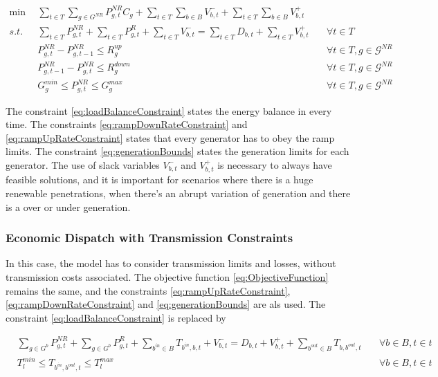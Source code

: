 \documentclass[12pt,LUDisStyle,twosided]{book}
\newcommand{\mc}{\mathcal}
\begin{document}
\begin{subequations}\label{model:simple_ED}
\begin{alignat}{4}
\min ~~& \sum_{t \in T}\sum_{g \in G^{NR}} P^{NR}_{g,t} C_{g} + \sum_{t \in T}\sum_{b \in B} V^{-}_{b,t} + \sum_{t \in T}\sum_{b \in B} V^{+}_{b,t} \label{eq:ObjectiveFunction} \\
s.t. ~~~& \sum_{t \in T} P^{NR}_{g,t} + \sum_{t \in T} P^{R}_{g,t} + \sum_{t \in T}V^{-}_{b,t} = \sum_{t \in T} D_{b,t}  + \sum_{t \in T}V^{+}_{b,t}  &~& \forall t \in T  \label{eq:loadBalanceConstraint} \\
& P^{NR}_{g,t} - P^{NR}_{g,t - 1} \leq R^{up}_{g} &~& \forall t \in T, g \in \mc{G}^{NR}\label{eq:rampUpRateConstraint} \\
& P^{NR}_{g,t -1 } - P^{NR}_{g,t} \leq R^{down}_{g} &~& \forall t \in T, g \in \mc{G}^{NR}\label{eq:rampDownRateConstraint} \\
& G^{min}_{g}\leq P^{NR}_{g,t} \leq G^{max}_{g} &~& \forall t \in T, g \in \mc{G}^{NR}\label{eq:generationBounds}
\end{alignat} 
\end{subequations}

The constraint \ref{eq:loadBalanceConstraint} states the energy balance in every time. The constraints \ref{eq:rampDownRateConstraint} and \ref{eq:rampUpRateConstraint} states that every generator has to obey the ramp limits. The constraint \ref{eq:generationBounds} states the generation limits for each generator. The use of slack variables $V^{-}_{b,t}$ and $V^{+}_{b,t}$ is necessary to always have feasible solutions, and it is important for scenarios where there is a huge renewable penetrations, when there's an abrupt variation of generation and there is a over or under generation.   

\subsubsection{Economic Dispatch with Transmission Constraints}

In this case, the model has to consider transmission limits and losses, without transmission costs associated. The objective function \ref{eq:ObjectiveFunction} remains the same, and the constraints \ref{eq:rampUpRateConstraint}, \ref{eq:rampDownRateConstraint} and \ref{eq:generationBounds} are als used. The constraint \ref{eq:loadBalanceConstraint} is replaced by  

\begin{subequations}\label{model:edTransmissionConstraints}
\begin{alignat}{4}
&\sum_{g \in G^{b}} P^{NR}_{g,t} + \sum_{g \in G^{b}} P^{R}_{g,t} + \sum_{b^{in} \in B} T_{b^{in},b,t} + V^{-}_{b,t} = D_{b,t}  + V^{+}_{b,t} + \sum_{b^{out} \in B} T_{b,b^{out},t}  &~& \forall b \in B, t \in t \label{eq:transmissionBalanceConstraint} \\
& T^{min}_{l} \leq T_{b^{in},b^{out},t} \leq T^{max}_{l}  &~& \forall b \in B, t \in t \label{eq:transmissionLimits}
\end{alignat} 
\end{subequations}
\end{document}
